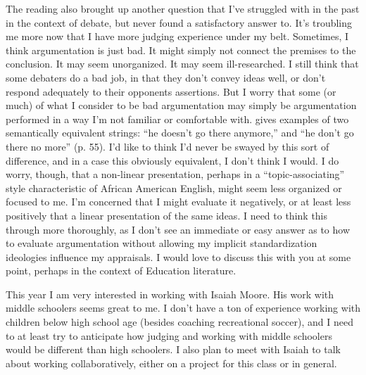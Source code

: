 \documentclass[doc,12pt]{apa6}
\begin{document}
The reading also brought up another question that I've struggled with in the
past in the context of debate, but never found a satisfactory answer to. It's
troubling me more now that I have more judging experience under my belt.
Sometimes, I think argumentation is just bad. It might simply not connect the
premises to the conclusion. It may seem unorganized. It may seem
ill-researched. I still think that some debaters do a bad job, in that they
don't convey ideas well, or don't respond adequately to their opponents
assertions. But I worry that some (or much) of what I consider to be bad
argumentation may simply be argumentation performed in a way I'm not familiar
or comfortable with. 
 gives examples of two semantically equivalent strings:
``he doesn't go there anymore,'' and ``he don't go there no more'' (p. 55).
I'd like to think I'd never be swayed by this sort of difference, and in a case
this obviously equivalent, I don't think I would. I do worry, though, that a
non-linear presentation, perhaps in a ``topic-associating''
\cite[p.~102]{CharityHudley10} style characteristic of African American
English, might seem less organized or focused to me. I'm concerned that I might
evaluate it negatively, or at least less positively that a linear presentation
of the same ideas. 
I need to think this through more thoroughly, as I don't see an immediate or
easy answer as to how to evaluate argumentation without allowing my implicit
standardization ideologies influence my appraisals. I would love to discuss
this with you at some point, perhaps in the context of Education literature. 

This year I am very interested in working with Isaiah Moore. His work with
middle schoolers seems great to me. 
I don't have a ton of experience working with children below high school age
(besides coaching recreational soccer), and I need to at least try to
anticipate how judging and working with middle schoolers would be different
than high schoolers. I also plan to meet with Isaiah to talk about working
collaboratively, either on a project for this class or in general. 

\clearpage



\end{document}
